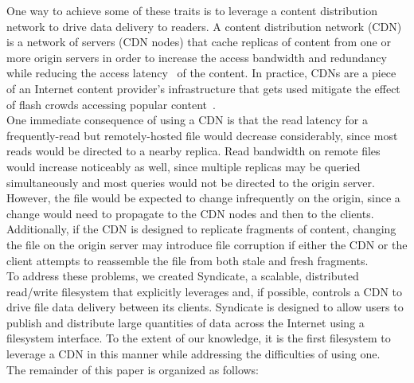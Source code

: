 {%
One way to achieve some of these traits is to leverage a content distribution network to drive data delivery to readers.  A content distribution network (CDN) is a network of servers (CDN nodes) that cache replicas of content from one or more origin servers in order to increase the access bandwidth and redundancy while reducing the access latency~\cite{citation needed} of the content.  In practice, CDNs are a piece of an Internet content provider's infrastructure that gets used mitigate the effect of flash crowds accessing popular content~\cite{citation needed}.
\\
One immediate consequence of using a CDN is that the read latency for a frequently-read but remotely-hosted file would decrease considerably, since most reads would be directed to a nearby replica.  Read bandwidth on remote files would increase noticeably as well, since multiple replicas may be queried simultaneously and most queries would not be directed to the origin server.  However, the file would be expected to change infrequently on the origin, since a change would need to propagate to the CDN nodes and then to the clients.  Additionally, if the CDN is designed to replicate fragments of content, changing the file on the origin server may introduce file corruption if either the CDN or the client attempts to reassemble the file from both stale and fresh fragments.
\\
To address these problems, we created Syndicate, a scalable, distributed read/write filesystem that explicitly leverages and, if possible, controls a CDN to drive file data delivery between its clients.  Syndicate is designed to allow users to publish and distribute large quantities of data across the Internet using a filesystem interface.  To the extent of our knowledge, it is the first filesystem to leverage a CDN in this manner while addressing the difficulties of using one.
\\
The remainder of this paper is organized as follows:
}

